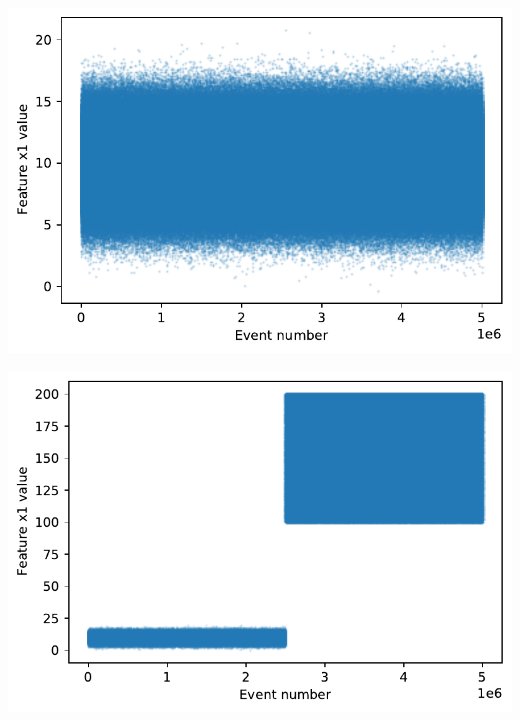 \begin{center}
\begin{minipage}{.5\textwidth}
  \centering
  \includegraphics[width=1\linewidth]{figures/01-reference.pdf}
  \label{fig:timeseries-r1}
\end{minipage}%
\begin{minipage}{.5\textwidth}
  \centering
  \includegraphics[width=1\linewidth]{figures/01-target.pdf}
  \label{fig:timeseries-t1}
\end{minipage}
\end{center}

